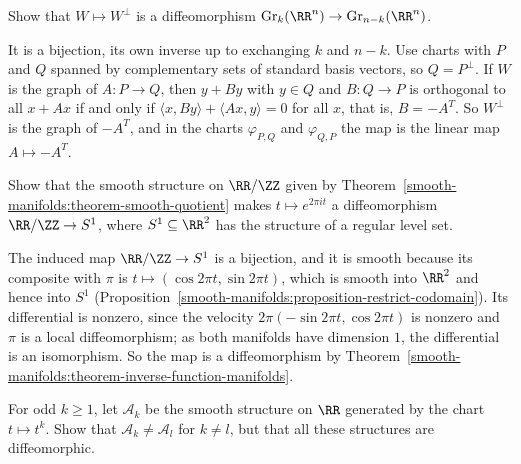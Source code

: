 \begin{exercise}\label{smooth-manifolds:exercise-grassmannian-duality}
Show that $W \mapsto W^\perp$ is a diffeomorphism $\mathrm{Gr}_k(\RR^n) \to \mathrm{Gr}_{n-k}(\RR^n)$.
\end{exercise}

\begin{solution}
It is a bijection, its own inverse up to exchanging $k$ and $n - k$. Use charts with $P$ and $Q$ spanned by complementary sets of standard basis vectors, so $Q = P^\perp$. If $W$ is the graph of $A \colon P \to Q$, then
$y + By$ with $y \in Q$ and $B \colon Q \to P$ is orthogonal to all $x + Ax$ if and only if $\langle x, By\rangle + \langle Ax, y\rangle = 0$ for all $x$, that is, $B = -A^T$. So $W^\perp$ is the graph of $-A^T$, and in the charts
$\varphi_{P,Q}$ and $\varphi_{Q,P}$ the map is the linear map $A \mapsto -A^T$.
\end{solution}

\begin{exercise}\label{smooth-manifolds:exercise-circle-quotient}
Show that the smooth structure on $\RR/\ZZ$ given by Theorem~\ref{smooth-manifolds:theorem-smooth-quotient} makes $t \mapsto e^{2\pi it}$ a diffeomorphism $\RR/\ZZ \to S^1$, where $S^1 \subseteq \RR^2$ has the structure of a regular level set.
\end{exercise}

\begin{solution}
The induced map $\RR/\ZZ \to S^1$ is a bijection, and it is smooth because its composite with $\pi$ is $t \mapsto (\cos 2\pi t, \sin 2\pi t)$, which is smooth
into $\RR^2$ and hence into $S^1$ (Proposition~\ref{smooth-manifolds:proposition-restrict-codomain}). Its differential is nonzero, since the velocity
$2\pi(-\sin 2\pi t, \cos 2\pi t)$ is nonzero and $\pi$ is a local diffeomorphism; as both manifolds have dimension $1$, the differential is an isomorphism. So
the map is a diffeomorphism by Theorem~\ref{smooth-manifolds:theorem-inverse-function-manifolds}.
\end{solution}

\begin{exercise}\label{smooth-manifolds:exercise-powers-line}
For odd $k \geq 1$, let $\mathcal{A}_k$ be the smooth structure on $\RR$ generated by the chart $t \mapsto t^k$. Show that $\mathcal{A}_k \neq \mathcal{A}_l$
for $k \neq l$, but that all these structures are diffeomorphic.
\end{exercise}

